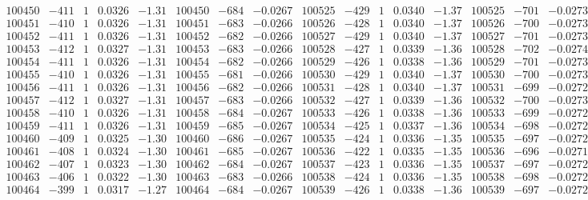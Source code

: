 \documentclass[11pt,reqno,a4letter]{article}
\numberwithin{figure}{section}
\numberwithin{table}{section}
\theoremstyle{plain}
\numberwithin{theorem}{section}
\theoremstyle{definition}
\begin{document}
\begin{table}[ht!]
\begin{equation*}
{\begin{array}{ccccc|ccc||ccccc|ccc}
100450 & -411 & 1 & 0.0326 & -1.31 & 100450 & -684 & -0.0267 & 100525 & -429 & 1 & 0.0340 & -1.37 & 100525 & -701 & -0.0273  \\
100451 & -410 & 1 & 0.0326 & -1.31 & 100451 & -683 & -0.0266 & 100526 & -428 & 1 & 0.0340 & -1.37 & 100526 & -700 & -0.0273  \\
100452 & -411 & 1 & 0.0326 & -1.31 & 100452 & -682 & -0.0266 & 100527 & -429 & 1 & 0.0340 & -1.37 & 100527 & -701 & -0.0273  \\
100453 & -412 & 1 & 0.0327 & -1.31 & 100453 & -683 & -0.0266 & 100528 & -427 & 1 & 0.0339 & -1.36 & 100528 & -702 & -0.0274  \\
100454 & -411 & 1 & 0.0326 & -1.31 & 100454 & -682 & -0.0266 & 100529 & -426 & 1 & 0.0338 & -1.36 & 100529 & -701 & -0.0273  \\
100455 & -410 & 1 & 0.0326 & -1.31 & 100455 & -681 & -0.0266 & 100530 & -429 & 1 & 0.0340 & -1.37 & 100530 & -700 & -0.0273  \\
100456 & -411 & 1 & 0.0326 & -1.31 & 100456 & -682 & -0.0266 & 100531 & -428 & 1 & 0.0340 & -1.37 & 100531 & -699 & -0.0272  \\
100457 & -412 & 1 & 0.0327 & -1.31 & 100457 & -683 & -0.0266 & 100532 & -427 & 1 & 0.0339 & -1.36 & 100532 & -700 & -0.0273  \\
100458 & -410 & 1 & 0.0326 & -1.31 & 100458 & -684 & -0.0267 & 100533 & -426 & 1 & 0.0338 & -1.36 & 100533 & -699 & -0.0272  \\
100459 & -411 & 1 & 0.0326 & -1.31 & 100459 & -685 & -0.0267 & 100534 & -425 & 1 & 0.0337 & -1.36 & 100534 & -698 & -0.0272  \\
100460 & -409 & 1 & 0.0325 & -1.30 & 100460 & -686 & -0.0267 & 100535 & -424 & 1 & 0.0336 & -1.35 & 100535 & -697 & -0.0272  \\
100461 & -408 & 1 & 0.0324 & -1.30 & 100461 & -685 & -0.0267 & 100536 & -422 & 1 & 0.0335 & -1.35 & 100536 & -696 & -0.0271  \\
100462 & -407 & 1 & 0.0323 & -1.30 & 100462 & -684 & -0.0267 & 100537 & -423 & 1 & 0.0336 & -1.35 & 100537 & -697 & -0.0272  \\
100463 & -406 & 1 & 0.0322 & -1.30 & 100463 & -683 & -0.0266 & 100538 & -424 & 1 & 0.0336 & -1.35 & 100538 & -698 & -0.0272  \\
100464 & -399 & 1 & 0.0317 & -1.27 & 100464 & -684 & -0.0267 & 100539 & -426 & 1 & 0.0338 & -1.36 & 100539 & -697 & -0.0272  \\
\end{array}
}
\end{equation*} 

\end{table}
\clearpage 
\end{document}
